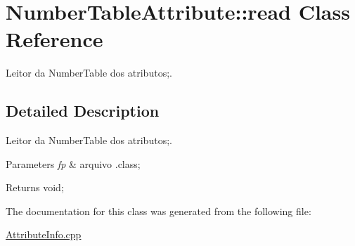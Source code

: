 \hypertarget{class_number_table_attribute_1_1read}{}\section{Number\+Table\+Attribute\+:\+:read Class Reference}
\label{class_number_table_attribute_1_1read}


Leitor da Number\+Table dos atributos;.  




\subsection{Detailed Description}
Leitor da Number\+Table dos atributos;. 


\begin{DoxyParams}{Parameters}
{\em fp} & arquivo .class; \\
\hline
\end{DoxyParams}
\begin{DoxyReturn}{Returns}
void; 
\end{DoxyReturn}


The documentation for this class was generated from the following file\+:\begin{DoxyCompactItemize}
\item 
\hyperlink{_attribute_info_8cpp}{Attribute\+Info.\+cpp}\end{DoxyCompactItemize}
